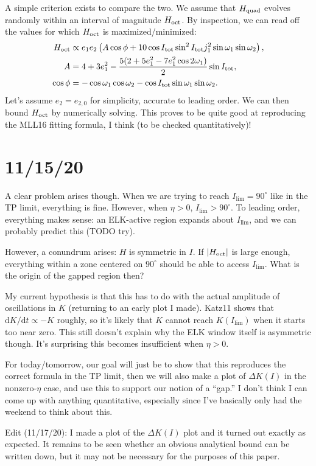 \documentclass[11pt,
        usenames, %
        dvipsnames %
    ]{article}
\newcommand*{\rdil}[2]{\mathrm{d}#1 / \mathrm{d}#2}
\newcommand*{\abs}[1]{\left|#1\right|}
\newcommand*{\p}[1]{\left(#1\right)}
\begin{document}
A simple criterion exists to compare the two. We assume that $H_{\rm quad}$
evolves randomly within an interval of magnitude $H_{\rm oct}$. By inspection,
we can read off the values for which $H_{\rm oct}$ is maximized/minimized:
\begin{align}
    H_{\rm oct} &\propto e_1 e_2 \p{
        A \cos \phi + 10 \cos I_{\rm tot} \sin^2 I_{\rm tot} j_1^2
        \sin \omega_1 \sin \omega_2},\\
    A &= 4 + 3e_1^{2} - \frac{5(2 + 5e_1^2 - 7e_1^2 \cos 2\omega_1)}{2}
        \sin I_{\rm tot},\\
    \cos \phi &= -\cos \omega_1 \cos \omega_2 - \cos I_{\rm tot} \sin \omega_1
        \sin \omega_2.
\end{align}
Let's assume $e_2 = e_{2, 0}$ for simplicity, accurate to leading order. We can
then bound $H_{\rm oct}$ by numerically solving. This proves to be quite
good at reproducing the MLL16 fitting formula, I think (to be checked
quantitatively)!

\section{11/15/20}

A clear problem arises though. When we are trying to reach $I_{\lim} = 90^\circ$
like in the TP limit, everything is fine. However, when $\eta > 0$, $I_{\lim} >
90^\circ$. To leading order, everything makes sense: an ELK-active region
expands about $I_{\lim}$, and we can probably predict this (TODO try).

However, a conundrum arises: $H$ is symmetric in $I$. If $\abs{H_{\rm oct}}$ is
large enough, everything within a zone centered on $90^\circ$ should be able to
access $I_{\lim}$. What is the origin of the gapped region then?

My current hypothesis is that this has to do with the actual amplitude of
oscillations in $K$ (returning to an early plot I made). Katz11 shows that
$\rdil{K}{t} \propto -K$ roughly, so it's likely that $K$ cannot reach
$K(I_{\lim})$ when it starts too near zero. This still doesn't explain why the
ELK window itself is asymmetric though. It's surprising this becomes
insufficient when $\eta > 0$.

For today/tomorrow, our goal will just be to show that this reproduces the
correct formula in the TP limit, then we will also make a plot of $\Delta K(I)$
in the nonzero-$\eta$ case, and use this to support our notion of a ``gap.'' I
don't think I can come up with anything quantitative, especially since I've
basically only had the weekend to think about this.

Edit (11/17/20): I made a plot of the $\Delta K(I)$ plot and it turned out
exactly as expected. It remains to be seen whether an obvious analytical bound
can be written down, but it may not be necessary for the purposes of this paper.
\end{document}
